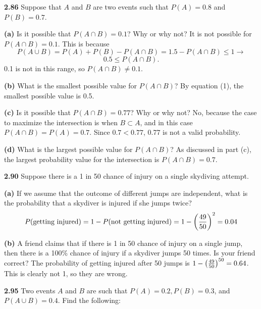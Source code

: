 \documentclass{exam}
\begin{document}
\begin{questions}
\newpage




\textbf{2.86 } Suppose that $A$ and $B$ are two events such that $P(A) = 0.8$ and $P(B) = 0.7$.

\textbf{(a) } Is it possible that $P(A \cap B) = 0.1$? Why or why not?
\sol
It is not possible for $P(A \cap B) = 0.1$. This is because
$$P(A \cup B) = P(A) + P(B) - P(A \cap B) = 1.5 - P(A \cap B) \leq 1 \rightarrow$$
\begin{equation}
    0.5 \leq P(A \cap B).
\end{equation}
0.1 is not in this range, so $P(A \cap B) \neq 0.1$.


\textbf{(b) } What is the smallest possible value for $P(A \cap B)$?
\sol
By equation (1), the smallest possible value is 0.5.
\newline

\textbf{(c) } Is it possible that $P(A \cap B) = 0.77$? Why or why not?
\sol
No, because the case to maximize the intersection is when $B \subset A$, and in this case $P(A \cap B) = P(A) = 0.7$. Since $0.7 < 0.77$, 0.77 is not a valid probability.
\newline


\textbf{(d) } What is the largest possible value for $P(A \cap B)$?
\sol
As discussed in part (c), the largest probability value for the intersection is $P(A \cap B) = 0.7$.


\newpage



\textbf{2.90 } Suppose there is a 1 in 50 chance of injury on a single skydiving attempt.

\textbf{(a) } If we assume that the outcome of different jumps are independent, what is the probability that a skydiver is injured if she jumps twice?
\sol
$$P(\text{getting injured}) = 1 - P(\text{not getting injured}) = 1 - \left( \frac{49}{50} \right)^2 = 0.04$$


\textbf{(b) } A friend claims that if there is 1 in 50 chance of injury on a single jump, then there is a 100\% chance of injury if a skydiver jumps 50 times. Is your friend correct?
\sol
The probability of getting injured after 50 jumps is $1 - \left( \frac{49}{50} \right)^{50} = 0.64$. This is clearly not 1, so they are wrong.


\newpage



\textbf{2.95 } Two events $A$ and $B$ are such that $P(A) = 0.2, P(B) = 0.3$, and $P(A \cup B) = 0.4$. Find the following:


\end{questions}
\end{document}
